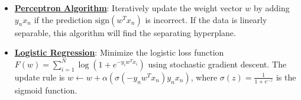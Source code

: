 \documentclass{article}%
\begin{document}
\begin{itemize}[leftmargin=*]%
\item \href{https://purdue.brightspace.com/d2l/common/assets/pdfjs-d2l-dist/1.0.14-legacy/web/viewer.html?file=\%2Fcontent\%2Fenforced\%2F1095467-wl.202510.CS.24300.001\%2F05L2-ML Basics.pdf\%3Fou\%3D1095467\&lang=en-us\&container=d2l-fileviewer-rendered-pdf\&fullscreen=d2l-fileviewer-rendered-pdf-dialog\&height=667#page=30}{\textbf{Perceptron Algorithm}}: Iteratively update the weight vector $w$ by adding $y_nx_n$ if the prediction $\text{sign}(w^Tx_n)$ is incorrect. If the data is linearly separable, this algorithm will find the separating hyperplane.%
\item \href{https://purdue.brightspace.com/d2l/common/assets/pdfjs-d2l-dist/1.0.14-legacy/web/viewer.html?file=\%2Fcontent\%2Fenforced\%2F1095467-wl.202510.CS.24300.001\%2F05L2-ML Basics.pdf\%3Fou\%3D1095467\&lang=en-us\&container=d2l-fileviewer-rendered-pdf\&fullscreen=d2l-fileviewer-rendered-pdf-dialog\&height=667#page=31}{\textbf{Logistic Regression}}: Minimize the logistic loss function $F(w) = \sum_{i=1}^{N} \log(1 + e^{-y_iw^Tx_i})$ using stochastic gradient descent. The update rule is $w \leftarrow w + \alpha(\sigma(-y_nw^Tx_n)y_nx_n)$, where $\sigma(z) = \frac{1}{1 + e^{-z}}$ is the sigmoid function.%
\end{itemize}%
\end{document}
